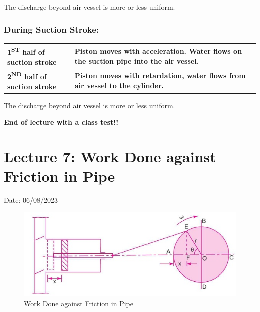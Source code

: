 \documentclass{article}
\begin{document}
    The discharge beyond air vessel is more or less uniform.

    \subsubsection*{During Suction Stroke:}


    \begin{table}[ht]
      \centering
      \renewcommand{\arraystretch}{2.5} 
      \begin{tabularx}{\textwidth}{>{\hsize=0.4\hsize\centering\arraybackslash}X>{\hsize=0.6\hsize\centering\arraybackslash}X}
        \hline
        \textbf{1\textsuperscript{ST} half of suction stroke} & \textbf{Piston moves with acceleration. Water flows on the suction pipe into the air vessel.} \\
        \hline
        \textbf{2\textsuperscript{ND} half of suction stroke} & \textbf{Piston moves with retardation, water flows from air vessel to the cylinder.} \\
        \hline
      \end{tabularx}
    \end{table}

    The discharge beyond air vessel is more or less uniform.

    \vspace*{1cm}
    \textbf{End of lecture with a class test!! }
    \hrulefill
    \vspace*{1.5cm} 

    \section{Lecture 7: Work Done against Friction in Pipe}
    \hfill Date: 06/08/2023

    \begin{figure}[h]
      \begin{center}
        \includegraphics[width=0.7\linewidth]{img/acceleration_piston.jpg}
        \caption{Work Done against Friction in Pipe}
      \end{center}
    \end{figure}
\end{document}
